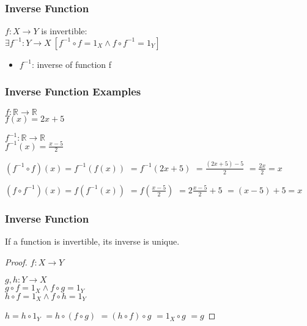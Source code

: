 \documentclass[dvipsnames]{beamer}
\begin{document}
\begin{frame}
  \frametitle{Inverse Function}

  \begin{definition}
    $f: X \rightarrow Y$ is \alert{invertible}:\\
      $\exists f^{-1}: Y \rightarrow X~[f^{-1} \circ f = 1_X
                                      \wedge f \circ f^{-1} = 1_Y]$

    \begin{itemize}
      \item $f^{-1}$: \alert{inverse} of function f
    \end{itemize}
  \end{definition}
\end{frame}

\begin{frame}
  \frametitle{Inverse Function Examples}

  $f: \mathbb{R} \rightarrow \mathbb{R}$\\
  $f(x) = 2x + 5$

  \pause
  \bigskip
  $f^{-1}: \mathbb{R} \rightarrow \mathbb{R}$\\
  $f^{-1}(x) = \frac{x - 5}{2}$

  \pause
  \bigskip
  $(f^{-1} \circ f)(x) = f^{-1}(f(x))$
  \pause
  $ = f^{-1}(2x + 5)$
  \pause
  $ = \frac{(2x + 5) - 5}{2}$
  \pause
  $ = \frac{2x}{2} = x$
  \medskip

  \pause
  $(f \circ f^{-1})(x) = f(f^{-1}(x))$
  \pause
  $ = f(\frac{x - 5}{2})$
  \pause
  $ = 2 \frac{x - 5}{2} + 5$
  \pause
  $ = (x - 5) + 5 = x$
\end{frame}

\begin{frame}
  \frametitle{Inverse Function}

  \begin{theorem}
    If a function is invertible, its inverse is unique.
  \end{theorem}

  \pause
  \begin{proof}
    $f: X \rightarrow Y$

    \pause
    \medskip
    $g,h: Y \rightarrow X$\\
    $g \circ f = 1_X \wedge f \circ g = 1_Y$\\
    $h \circ f = 1_X \wedge f \circ h = 1_Y$

    \pause
    \medskip
    $h = h \circ 1_Y$
    \pause
    $ = h \circ (f \circ g)$
    \pause
    $ = (h \circ f) \circ g$
    \pause
    $ = 1_X \circ g$
    \pause
    $ = g$
  \end{proof}
\end{frame}
\end{document}
